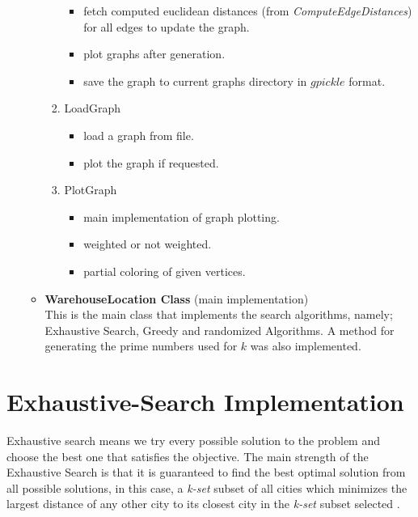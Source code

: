 \documentclass[longpaper, english, final, times]{revdetua}
\begin{document}
\begin{itemize}
\begin{itemize}
\begin{enumerate}[label=\arabic*), topsep=0pt,itemsep=0ex,partopsep=1ex,parsep=1ex]
\begin{itemize}
							\item fetch computed euclidean distances (from \emph{ComputeEdgeDistances}) for all edges to update the graph. 
							\item plot graphs after generation.
							\item save the graph to current graphs directory in $gpickle$ format.
						\end{itemize}
						\item LoadGraph
						\begin{itemize}
							[topsep=0pt,itemsep=-1ex,partopsep=1ex,parsep=1ex]
							\item load a graph from file.
							\item plot the graph if requested.
						\end{itemize}
						\item PlotGraph
						\begin{itemize}
							[topsep=0pt,itemsep=-1ex,partopsep=1ex,parsep=1ex]
							\item main implementation of graph plotting.
							\item weighted or not weighted.
							\item partial coloring of given vertices.
						\end{itemize}
					\end{enumerate}
				\item \textbf{WarehouseLocation Class} (main implementation) \\
					This is the main class that implements the search algorithms, namely; Exhaustive Search, Greedy and randomized Algorithms. A method for generating the prime numbers used for $k$ was also implemented. 
			\end{itemize}
		\end{itemize}
	
	 	
	\section{\label{outline:exhaustive} Exhaustive-Search Implementation}
		Exhaustive search means we try every possible solution to the problem and choose the best one that satisfies the objective. The main strength of the Exhaustive Search is that it is guaranteed to find the best optimal solution from all possible solutions, in this case, a \emph{k-set} subset of all cities which minimizes the largest distance of any other city to its closest city in the \emph{k-set} subset selected \cite{hui2010study}.\\
		
\end{document}
